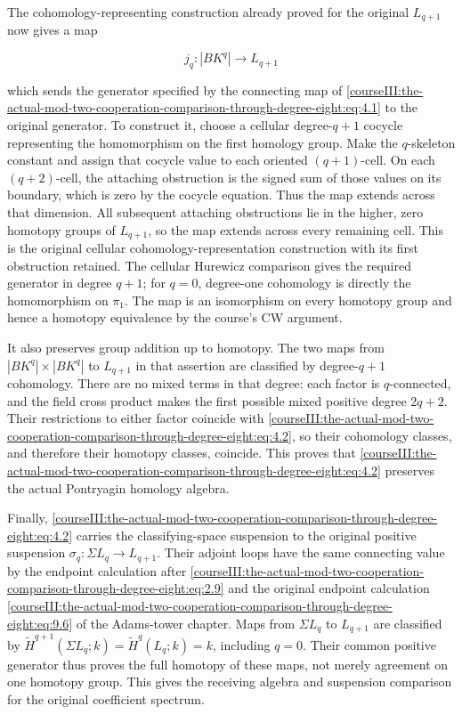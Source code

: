 The cohomology-representing construction already proved for the original \(L_{q+1}\) now gives a map

\begin{equation}
j_q:|BK^q|\longrightarrow L_{q+1}
\label{courseIII:the-actual-mod-two-cooperation-comparison-through-degree-eight:eq:4.2}
\end{equation}

which sends the generator specified by the connecting map of \eqref{courseIII:the-actual-mod-two-cooperation-comparison-through-degree-eight:eq:4.1} to the original generator. To construct it, choose a cellular degree-\(q+1\) cocycle representing the homomorphism on the first homology group. Make the \(q\)-skeleton constant and assign that cocycle value to each oriented \((q+1)\)-cell. On each \((q+2)\)-cell, the attaching obstruction is the signed sum of those values on its boundary, which is zero by the cocycle equation. Thus the map extends across that dimension. All subsequent attaching obstructions lie in the higher, zero homotopy groups of \(L_{q+1}\), so the map extends across every remaining cell. This is the original cellular cohomology-representation construction with its first obstruction retained. The cellular Hurewicz comparison gives the required generator in degree \(q+1\); for \(q=0\), degree-one cohomology is directly the homomorphism on \(\pi_1\). The map is an isomorphism on every homotopy group and hence a homotopy equivalence by the course's CW argument.

It also preserves group addition up to homotopy. The two maps from \(|BK^q|\times|BK^q|\) to \(L_{q+1}\) in that assertion are classified by degree-\(q+1\) cohomology. There are no mixed terms in that degree: each factor is \(q\)-connected, and the field cross product makes the first possible mixed positive degree \(2q+2\). Their restrictions to either factor coincide with \eqref{courseIII:the-actual-mod-two-cooperation-comparison-through-degree-eight:eq:4.2}, so their cohomology classes, and therefore their homotopy classes, coincide. This proves that \eqref{courseIII:the-actual-mod-two-cooperation-comparison-through-degree-eight:eq:4.2} preserves the actual Pontryagin homology algebra.

Finally, \eqref{courseIII:the-actual-mod-two-cooperation-comparison-through-degree-eight:eq:4.2} carries the classifying-space suspension to the original positive suspension \(\sigma_q:\Sigma L_q\to L_{q+1}\). Their adjoint loops have the same connecting value by the endpoint calculation after \eqref{courseIII:the-actual-mod-two-cooperation-comparison-through-degree-eight:eq:2.9} and the original endpoint calculation \eqref{courseIII:the-actual-mod-two-cooperation-comparison-through-degree-eight:eq:9.6} of the Adams-tower chapter. Maps from \(\Sigma L_q\) to \(L_{q+1}\) are classified by \(\widetilde H^{q+1}(\Sigma L_q;k)=\widetilde H^q(L_q;k)=k\), including \(q=0\). Their common positive generator thus proves the full homotopy of these maps, not merely agreement on one homotopy group. This gives the receiving algebra and suspension comparison for the original coefficient spectrum.

